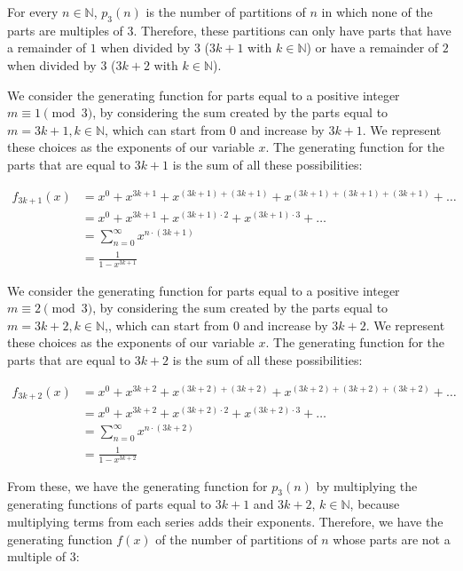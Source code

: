 \documentclass[10pt]{article}
\begin{document}
\begin{enumerate}
\begin{enumerate}
    For every $n \in \mathbb{N}$, $p_3(n)$ is the number of partitions of $n$ in which none of the parts are multiples of 3. Therefore, these partitions can only have parts that have a remainder of $1$ when divided by $3$ ($3k+1$ with $k \in \mathbb{N}$) or have a remainder of $2$ when divided by $3$ ($3k+2$ with $k \in \mathbb{N}$).

    We consider the generating function for parts equal to a positive integer $m \equiv 1 \pmod 3$, by considering the sum created by the parts equal to $m= 3k+1, k \in \mathbb{N}$, which can start from $0$ and increase by $3k+1$. We represent these choices as the exponents of our variable $x$. The generating function for the parts that are equal to $3k+1$ is the sum of all these possibilities:
    
    \begin{align*}
    f_{3k+1}(x) &= x^0+x^{3k+1} + x^{(3k+1)+(3k+1)} + x^{(3k+1)+(3k+1)+(3k+1)} + \ldots  \\
    &= x^0+x^{3k+1} + x^{(3k+1)\cdot 2} + x^{(3k+1)\cdot 3} + \ldots  \\
        &= \sum\limits^{\infty}_{n=0}x^{n\cdot(3k+1)}\\
        &= \frac{1}{1-x^{3k+1}}
    \end{align*}

    We consider the generating function for parts equal to a positive integer $m \equiv 2 \pmod 3$, by considering the sum created by the parts equal to $m= 3k+2, k \in \mathbb{N}$,, which can start from $0$ and increase by $3k+2$. We represent these choices as the exponents of our variable $x$. The generating function for the parts that are equal to $3k+2$ is the sum of all these possibilities:
    
    \begin{align*}
    f_{3k+2}(x) &= x^0+x^{3k+2} + x^{(3k+2)+(3k+2)} + x^{(3k+2)+(3k+2)+(3k+2)} + \ldots  \\
    &= x^0+x^{3k+2} + x^{(3k+2)\cdot 2} + x^{(3k+2)\cdot 3} + \ldots  \\
        &= \sum\limits^{\infty}_{n=0}x^{n\cdot(3k+2)}\\
        &= \frac{1}{1-x^{3k+2}}
    \end{align*}
    
    From these, we have the generating function for $p_3(n)$ by multiplying the generating functions of parts equal to $3k+1$ and $3k+2$, $k \in \mathbb{N}$, because multiplying terms from each series adds their exponents. Therefore, we have the generating function $f(x)$ of the number of partitions of $n$ whose parts are not a multiple of $3$: 
    

\end{enumerate}
\end{enumerate}
\end{document}
